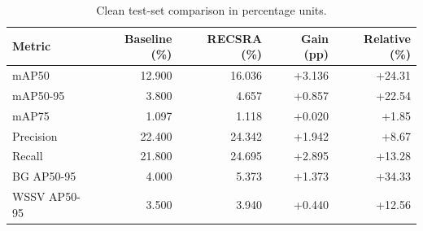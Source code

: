 \begin{table}[t]
\centering
\caption{Clean test-set comparison in percentage units.}
\label{tab:clean-results}
\begin{tabular}{lrrrr}
\hline
Metric & Baseline (\%) & RECSRA (\%) & Gain (pp) & Relative (\%) \\
\hline
mAP50 & 12.900 & 16.036 & +3.136 & +24.31 \\
mAP50-95 & 3.800 & 4.657 & +0.857 & +22.54 \\
mAP75 & 1.097 & 1.118 & +0.020 & +1.85 \\
Precision & 22.400 & 24.342 & +1.942 & +8.67 \\
Recall & 21.800 & 24.695 & +2.895 & +13.28 \\
BG AP50-95 & 4.000 & 5.373 & +1.373 & +34.33 \\
WSSV AP50-95 & 3.500 & 3.940 & +0.440 & +12.56 \\
\hline
\end{tabular}
\end{table}
